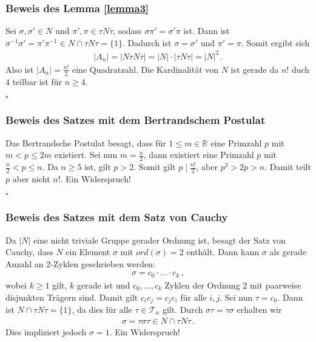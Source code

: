 \documentclass[12pt, german]{article}
\newcommand{\bewiesen}{
	
	\begin{flushright}
		$\square$  \\
\end{flushright}}
\begin{document}
	\subsubsection{Beweis des Lemma \ref{lemma3}}
	Sei $\sigma, \sigma' \in N$ und $\pi', \pi \in \tau N \tau$, sodass $\sigma\pi' = \sigma'\pi$ ist. Dann ist $\sigma^{-1}\sigma' = \pi'\pi^{-1} \in N \cap \tau N \tau = \{1\}$. Dadurch ist $\sigma = \sigma'$ und $\pi' = \pi$. Somit ergibt sich 
	\begin{align*}
		|A_n| = |N\tau N\tau| = |N| \cdot |\tau N \tau| = |N|^2\, .
	\end{align*}
	Also ist $|A_n| =\frac{n!}{2}$ eine Quadratzahl. Die Kardinalität von $N$ ist gerade da $n!$ duch $4$ teilbar ist für $n \geq 4$. 
	\bewiesen
	
	\subsubsection{Beweis des Satzes mit dem Bertrandschem Postulat}
	Das Bertrandsche Postulat besagt, dass für $1 \leq m \in \mathbb R$ eine Primzahl $p$ mit $m < p \leq 2m$ existiert. 
	\newline
	Sei nun $m =\frac{n}{2}$, dann existiert eine Primzahl $p$ mit $\frac{n}{2} < p \leq n$. Da $n \geq 5$ ist, gilt $p > 2$. Somit gilt $p \mid \frac{n!}{2}$, aber $p^2 > 2p >  n$. Damit teilt $p$ aber nicht $n!$. Ein Widerspruch!
	\bewiesen
	
	\subsubsection{Beweis des Satzes mit dem Satz von Cauchy}
	Da $|N|$ eine nicht triviale Gruppe gerader Ordnung ist, besagt der Satz von Cauchy, dass $N$ ein Element $\sigma$ mit $ord(\sigma) = 2$ enthält. 
	Dann kann $\sigma$ als gerade Anzahl an 2-Zyklen geschrieben werden:
	\begin{align*}
		\sigma = c_0 \cdot \ldots \cdot c_k\, ,
	\end{align*} 
	wobei $k\geq 1$ gilt, $k$ gerade ist und $c_0, \ldots, c_k$ Zyklen der Ordnung $2$ mit paarweise disjunkten Trägern sind. Damit gilt $c_ic_j = c_jc_i$ für alle $i,j$. 
	Sei nun $\tau = c_0$. Dann ist $N \cap \tau N \tau = \{1\}$, da dies für alle $\tau \in \mathcal T_n$ gilt. Durch $\sigma\tau = \tau \sigma$ erhalten wir
	\begin{align*}
		\sigma = \tau\sigma\tau \in N\cap \tau N \tau\, .
	\end{align*} 
	Dies impliziert jedoch $\sigma = 1$. Ein Widerspruch! 
	
\end{document}

